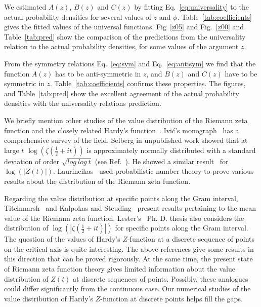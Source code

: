 \documentclass[twoside]{article}
\begin{document}
We estimated $A(z)$, $B(z)$ and $C(z)$ by fitting Eq.~\ref{eq:universality} to the actual
probability densities for several values of $z$ and $\phi$. Table~\ref{tab:coefficients} gives the 
fitted values 
of the universal functions.
Fig~\ref{z05} and Fig.~\ref{z00} and Table~\ref{tab:pred} show the comparison of the predictions 
from the universality 
relation to the actual probability densities, for some values of the argument $z$.

From the symmetry relations Eq.~\ref{eq:sym} and Eq.~\ref{eq:antisym} we find that the function 
$A(z)$ has to be anti-symmetric in $z$, and $B(z)$ and $C(z)$ have to be symmetric in $z$.
Table~\ref{tab:coefficients} confirms these properties. The figures, and 
Table~\ref{tab:pred} show the excellent agreement of the actual probability densities with the
universality relations prediction.

We briefly mention other studies of the value distribution of the Riemann zeta function and 
the closely related Hardy's function~\cite{Hardy 1918}.  Ivi\'c's monograph~\cite{Ivic 2013} has a comprehensive survey of  the field.
Selberg in unpublished work showed that at large $t$ $\log (\zeta(\frac{1}{2} + it))$ is approximately normally distributed with a standard deviation of order $\sqrt{log~log~t}$ (see Ref.~\cite{Hejhal}). He showed a 
similar result~\cite{Selberg 1989, Selberg 1991} for $\log (|Z(t)|)$. Laurincikas~\cite{Laurincikas}  used probabilistic number theory to prove various results about the distribution of the Riemann zeta function.

Regarding the value distribution at specific points along the Gram interval, 
Titchmarsh~\cite{Titchmarsh 1934} and Kalpokas and Steuding~\cite{kalpokas 2009} present 
results pertaining to the
mean value of the Riemann zeta function. Lester's~\cite{Lester 2013} Ph. D. thesis also 
considers the distribution of $\log (|\zeta(\frac{1}{2} + it)|)$  for specific points along the Gram interval.  
The question of the values of Hardy's $Z$-function at a discrete sequence of points on the critical axis 
is quite interesting. The above references give some results in this direction that can be proved rigorously. 
At the same time, the present state of Riemann zeta function theory gives limited information 
about the value distribution of $Z(t)$ at discrete sequences of points. Possibly, these analogues 
could differ significantly from the continuous case.  
Our numerical studies of the value distribution of Hardy's $Z$-function at discrete points
helps fill the gaps. 
\end{document}
